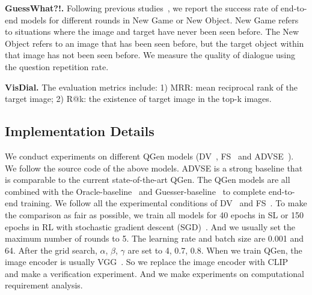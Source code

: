 \textbf{GuessWhat?!.} Following previous studies~\cite{de2017guesswhat}, we report the success rate of end-to-end models 
for different rounds in New Game or New Object. New Game refers to situations where the image and target have never been seen before. The New Object refers to an image that has been seen before, but the target object within that image has not been seen before. We measure the quality of dialogue using the question repetition rate. 

\textbf{VisDial.} The evaluation metrics include: 1) MRR: mean reciprocal rank of the target image; 2) R@k: the existence of target image in the top-k images.







\subsection{Implementation Details}

We conduct experiments on different QGen models (DV~\cite{de2017guesswhat}, FS~\cite{strub2017end} and ADVSE~\cite{2020Answer}).
We follow the source code of the above models.
ADVSE is a strong baseline that is comparable to the current state-of-the-art QGen. 
The QGen models are all combined with the Oracle-baseline~\cite{strub2017end} and Guesser-baseline~\cite{strub2017end} to complete end-to-end training. 
We follow all the experimental conditions of DV~\cite{de2017guesswhat} and FS~\cite{strub2017end}.
To make the comparison as fair as possible, we train all models for 40 epochs in SL or 150 epochs in RL with stochastic gradient descent (SGD)~\cite{bottou2010large}.
And we usually set the maximum number of rounds to 5.
The learning rate and batch size are 0.001 and 64. After the grid search, $\alpha$, $\beta$, $\gamma$ are set to 4, 0.7, 0.8.
When we train QGen, the image encoder is usually VGG~\cite{simonyan2014very}. So we replace the image encoder with CLIP~\cite{radford2021learning} and make a verification experiment.
And we make experiments on computational requirement analysis.





